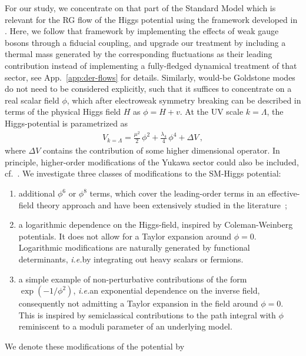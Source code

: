 \documentclass[aps,prd,11pt,tightenlines,superscriptaddress,nofootinbib,preprintnumbers,notitlepage]{revtex4-1}
\newcommand{\ie}{\textsl{i.e.}\;}
\begin{document}
For our study, we concentrate on that part of the Standard Model which
is relevant for the RG flow of the Higgs potential using the framework
developed in \cite{our_paper}. Here, we follow  that framework by 
implementing the effects of weak gauge bosons through a fiducial coupling, 
and upgrade our treatment by including a thermal mass generated by the
corresponding fluctuations as their leading contribution instead of 
implementing a fully-fledged dynamical treatment of that sector, 
see App.~\ref{app:der-flows} for details.
Similarly, would-be Goldstone modes do not
need to be considered explicitly, such that it suffices to concentrate
on a real scalar field $\phi$, which after electroweak symmetry
breaking can be described in terms of the physical Higgs field $H$ as
$\phi = H + v$.  At the UV scale $k=\Lambda$, the Higgs-potential is
parametrized as
%
\begin{align} 
 V_{k=\Lambda} = \frac{\mu^2}{2} \, \phi^2 + 
\frac{\lambda_4}{4} \, \phi^4  + \Delta V \,,
\label{eq:poly-start-pot}
\end{align}
%
where $\Delta V$ contains the contribution of some higher dimensional
operator. In principle, higher-order modifications of the Yukawa
sector could also be included,
cf.~\cite{Pawlowski:2014zaa,deVries:2017ncy,Gies:2017zwf}. We investigate three
classes of modifications to the SM-Higgs potential:
%
\begin{enumerate}
\setlength{\itemsep}{0mm}
\item additional $\phi^6$ or $\phi^8$ terms, which cover the
  leading-order terms in an effective-field theory approach and have
  been extensively studied in the
  literature~\cite{eft1,christophe_geraldine,eft2,Noble};
\item a logarithmic dependence on the Higgs-field, inspired by
  Coleman-Weinberg potentials. It does not allow for a Taylor expansion
  around $\phi=0$. Logarithmic modifications are naturally
  generated by functional determinants, \ie by integrating out
  heavy scalars or fermions.
\item a simple example of non-perturbative contributions of the form
  $\exp(-1/\phi^2)$, \ie an exponential dependence on the inverse
  field, consequently not admitting a Taylor expansion in the field
  around $\phi=0$. This is inspired by semiclassical contributions to
  the path integral with $\phi$ reminiscent to a moduli parameter of
  an underlying model.
\end{enumerate}
%
We denote these modifications of the potential by
%
\end{document}

